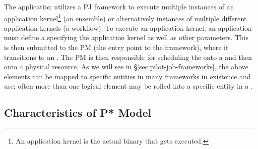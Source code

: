 \documentclass[conference]{IEEEtran}
\begin{document}






  
  The application utilizes a PJ framework to execute multiple
  instances of an application kernel\footnote{An application kernel is
  the actual binary that gets executed.} (an ensemble) or
  alternatively instances of multiple different application kernels (a
  workflow).  To execute an application kernel, an application must
  define a \cu specifying the application kernel as well as other
  parameters. This \cu is then submitted to the PM (the entry point to
  the \pilotjob framework), where it transitions to an \su. The PM is
  then responsible for scheduling the \su onto a \pilot and then onto
  a physical resource.  As we will see in
  \S\ref{sec:pilot-job-frameworks}, the above elements can be mapped
  to specific entities in many \pilotjob frameworks in existence and
  use; often more than one logical element may be rolled into
  a specific entity in a \pilotjob.

% 
% 


\subsection{Characteristics of P* Model}
\label{sec:p_star_elements}
\end{document}
